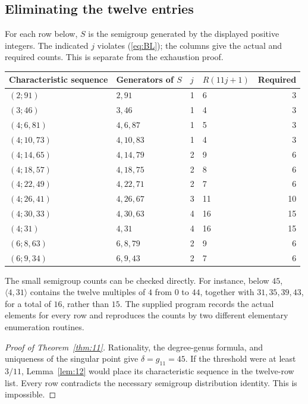 \documentclass[11pt]{article}
\theoremstyle{remark}\newtheorem{remark}[theorem]{Remark}
\begin{document}
\subsection{Eliminating the twelve entries}
For each row below, $S$ is the semigroup generated by the displayed positive integers. The indicated $j$ violates (\ref{eq:BL}); the columns give the actual and required counts. This is separate from the exhaustion proof.
\begin{center}\begin{tabular}{@{}llllr@{}}\toprule
Characteristic sequence & Generators of $S$ & $j$ & $R(11j+1)$ & Required\\\midrule
$(2;91)$ & $2,91$ & 1 & 6 & 3\\
$(3;46)$ & $3,46$ & 1 & 4 & 3\\
$(4;6,81)$ & $4,6,87$ & 1 & 5 & 3\\
$(4;10,73)$ & $4,10,83$ & 1 & 4 & 3\\
$(4;14,65)$ & $4,14,79$ & 2 & 9 & 6\\
$(4;18,57)$ & $4,18,75$ & 2 & 8 & 6\\
$(4;22,49)$ & $4,22,71$ & 2 & 7 & 6\\
$(4;26,41)$ & $4,26,67$ & 3 & 11 & 10\\
$(4;30,33)$ & $4,30,63$ & 4 & 16 & 15\\
$(4;31)$ & $4,31$ & 4 & 16 & 15\\
$(6;8,63)$ & $6,8,79$ & 2 & 9 & 6\\
$(6;9,34)$ & $6,9,43$ & 2 & 7 & 6\\\bottomrule
\end{tabular}\end{center}
The small semigroup counts can be checked directly. For instance, below $45$, $\langle4,31\rangle$ contains the twelve multiples of $4$ from $0$ to $44$, together with $31,35,39,43$, for a total of $16$, rather than $15$. The supplied program records the actual elements for every row and reproduces the counts by two different elementary enumeration routines.

\begin{proof}[Proof of Theorem~\ref{thm:11}]
Rationality, the degree-genus formula, and uniqueness of the singular point give $\delta=g_{11}=45$. If the threshold were at least $3/11$, Lemma~\ref{lem:12} would place its characteristic sequence in the twelve-row list. Every row contradicts the necessary semigroup distribution identity. This is impossible.
\end{proof}
\end{document}
